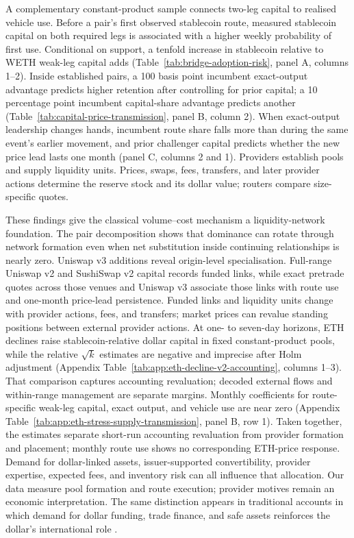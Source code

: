 A complementary constant-product sample connects two-leg capital to realised vehicle use. Before a pair's first observed stablecoin route, measured stablecoin capital on both required legs is associated with a \BridgeAdoptionRiskAnySupport{} higher weekly probability of first use. Conditional on support, a tenfold increase in stablecoin relative to WETH weak-leg capital adds \BridgeAdoptionRiskIntensiveTenfold{} (Table~\ref{tab:bridge-adoption-risk}, panel A, columns 1--2). Inside established pairs, a 100 basis point incumbent exact-output advantage predicts \ContestOutputAdvantageHundredBpEffect{} higher retention after controlling for prior capital; a 10 percentage point incumbent capital-share advantage predicts another \ContestCapitalAdvantageTenPpEffect{} (Table~\ref{tab:capital-price-transmission}, panel B, column 2). When exact-output leadership changes hands, incumbent route share falls \RankCrossingPlaceboDrop{} more than during the same event's earlier movement, and prior challenger capital predicts whether the new price lead lasts one month (panel C, columns 2 and 1). Providers establish pools and supply liquidity units. Prices, swaps, fees, transfers, and later provider actions determine the reserve stock and its dollar value; routers compare size-specific quotes.

These findings give the classical volume--cost mechanism a liquidity-network foundation. The pair decomposition shows that dominance can rotate through network formation even when net substitution inside continuing relationships is nearly zero. Uniswap v3 additions reveal origin-level specialisation. Full-range Uniswap v2 and SushiSwap v2 capital records funded links, while exact pretrade quotes across those venues and Uniswap v3 associate those links with route use and one-month price-lead persistence. Funded links and liquidity units change with provider actions, fees, and transfers; market prices can revalue standing positions between external provider actions. At one- to seven-day horizons, ETH declines raise stablecoin-relative dollar capital in fixed constant-product pools, while the relative $\sqrt{k}$ estimates are negative and imprecise after Holm adjustment (Appendix Table~\ref{tab:app:eth-decline-v2-accounting}, columns 1--3). That comparison captures accounting revaluation; decoded external flows and within-range management are separate margins. Monthly coefficients for route-specific weak-leg capital, exact output, and vehicle use are near zero (Appendix Table~\ref{tab:app:eth-stress-supply-transmission}, panel B, row 1). Taken together, the estimates separate short-run accounting revaluation from provider formation and placement; monthly route use shows no corresponding ETH-price response. Demand for dollar-linked assets, issuer-supported convertibility, provider expertise, expected fees, and inventory risk can all influence that allocation. Our data measure pool formation and route execution; provider motives remain an economic interpretation. The same distinction appears in traditional accounts in which demand for dollar funding, trade finance, and safe assets reinforces the dollar's international role \citep{GopinathStein2021Making,ChahrourValchev2022TradeFinance}.

